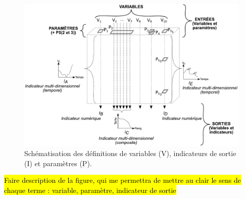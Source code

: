 \begin{figure}[!h]
	\includegraphics[width=\linewidth]{img/schemas_params.pdf}
	\caption{Schématisation des définitions de variables (V), indicateurs de sortie (I) et paramètres (P).} 
	\label{fig:parametres-these-complet} 
\end{figure}

\begin{center}
	\hl{Faire description de la figure, qui me permettra de mettre au clair le sens de chaque terme : variable, paramètre, indicateur de sortie}
\end{center}

%
%



